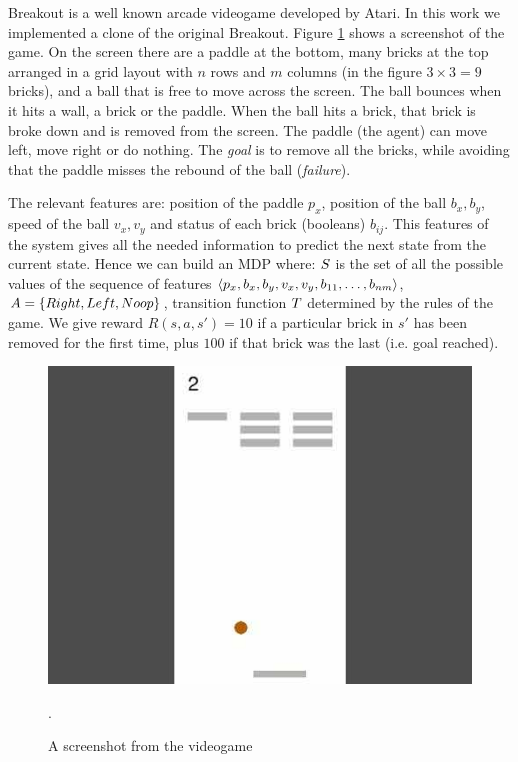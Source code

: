 \begin{example}
	Breakout is a well known arcade videogame developed by Atari. In this work we implemented a clone of the original Breakout. Figure \ref{fig:breakout} shows a screenshot of the game. On the screen there are a paddle at the bottom, many bricks at the top arranged in a grid layout with $n$ rows and $m$ columns (in the figure $3\times 3 = 9$ bricks), and a ball that is free to move across the screen. The ball bounces when it hits a wall, a brick or the paddle. When the ball hits a brick, that brick is broke down and is removed from the screen. The paddle (the agent) can move left, move right or do nothing. The \emph{goal} is to remove all the bricks, while avoiding that the paddle misses the rebound of the ball (\emph{failure}).
	
	The relevant features are: position of the paddle $p_x$, position of the ball $b_x, b_y$, speed of the ball $v_x, v_y$ and status of each brick (booleans) $b_{ij}$. This features of the system gives all the needed information to predict the next state from the current state. Hence we can build an MDP where: $S$ is the set of  all the possible values of the sequence of features $\langle p_x, b_x, b_y, v_x, v_y, b_{11}, \dots, b_{nm} \rangle$, $A = \{Right, Left, No\-op\}$, transition function $T$ determined by the rules of the game. We give reward $R(s,a,s')=10$ if a particular brick in $s'$ has been removed for the first time, plus $100$ if that brick was the last (i.e. goal reached).
	\begin{figure}[h]
		\centering
		\includegraphics[width=.6\linewidth]{images/breakout.jpg}
		\caption{A screenshot from the videogame \Breakout}\label{fig:breakout}. 
	\end{figure}

\end{example}

